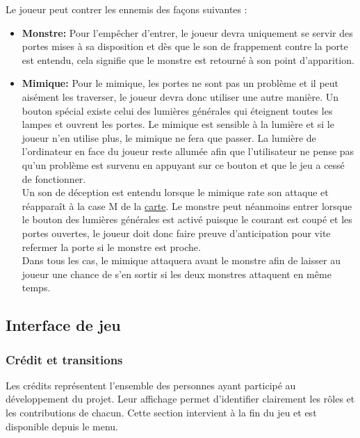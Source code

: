 \documentclass[11pt, a4paper]{article}
\begin{document}
    Le joueur peut contrer les ennemis des façons suivantes :
    \begin{itemize}
        \item\textbf{Monstre:} Pour l'empêcher d'entrer, le joueur devra uniquement se servir des portes mises à sa disposition et dès que le son de frappement contre la porte est entendu, cela signifie que le monstre est retourné à son point d'apparition.\\
        
        \item\textbf{Mimique:} Pour le mimique, les portes ne sont pas un problème et il peut aisément les traverser, le joueur devra donc utiliser une autre manière. Un bouton spécial existe celui des lumières générales qui éteignent toutes les lampes et ouvrent les portes. Le mimique est sensible à la lumière et si le joueur n'en utilise plus, le mimique ne fera que passer. La lumière de l'ordinateur en face du joueur reste allumée afin que l'utilisateur ne pense pas qu'un problème est survenu en appuyant sur ce bouton et que le jeu a cessé de fonctionner.\\ Un son de déception est entendu lorsque le mimique rate son attaque et réapparaît à la case M de la \hyperref[fig:carte]{carte}. Le monstre peut néanmoins entrer lorsque le bouton des lumières générales est activé puisque le courant est coupé et les portes ouvertes, le joueur doit donc faire preuve d'anticipation pour vite refermer la porte si le monstre est proche. \\Dans tous les cas, le mimique attaquera avant le monstre afin de laisser au joueur une chance de s'en sortir si les deux monstres attaquent en même temps.
    \end{itemize}
    
\newpage
\subsection{Interface de jeu}

\subsubsection{Crédit et transitions}
Les crédits représentent l’ensemble des personnes ayant participé au développement du projet. Leur affichage permet d’identifier clairement les rôles et les contributions de chacun. Cette section intervient à la fin du jeu et est disponible depuis le menu.\\
\end{document}
